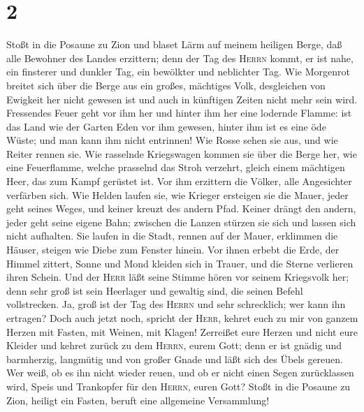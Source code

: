 \hypertarget{section-1}{%
\section{2}\label{section-1}}

 Stoßt in die Posaune zu Zion und blaset Lärm auf meinem
heiligen Berge, daß alle Bewohner des Landes erzittern; denn der Tag des
\textsc{Herrn} kommt, er ist nahe,  ein finsterer und
dunkler Tag, ein bewölkter und neblichter Tag. Wie Morgenrot breitet
sich über die Berge aus ein großes, mächtiges Volk, desgleichen von
Ewigkeit her nicht gewesen ist und auch in künftigen Zeiten nicht mehr
sein wird.  Fressendes Feuer geht vor ihm her und hinter
ihm her eine lodernde Flamme: ist das Land wie der Garten Eden vor ihm
gewesen, hinter ihm ist es eine öde Wüste; und man kann ihm nicht
entrinnen!  Wie Rosse sehen sie aus, und wie Reiter rennen
sie.  Wie rasselnde Kriegswagen kommen sie über die Berge
her, wie eine Feuerflamme, welche prasselnd das Stroh verzehrt, gleich
einem mächtigen Heer, das zum Kampf gerüstet ist.  Vor ihm
erzittern die Völker, alle Angesichter verfärben sich. 
Wie Helden laufen sie, wie Krieger ersteigen sie die Mauer, jeder geht
seines Weges, und keiner kreuzt des andern Pfad.  Keiner
drängt den andern, jeder geht seine eigene Bahn; zwischen die Lanzen
stürzen sie sich und lassen sich nicht aufhalten.  Sie
laufen in die Stadt, rennen auf der Mauer, erklimmen die Häuser, steigen
wie Diebe zum Fenster hinein.  Vor ihnen erbebt die Erde,
der Himmel zittert, Sonne und Mond kleiden sich in Trauer, und die
Sterne verlieren ihren Schein.  Und der \textsc{Herr}
läßt seine Stimme hören vor seinem Kriegsvolk her; denn sehr groß ist
sein Heerlager und gewaltig sind, die seinen Befehl vollstrecken. Ja,
groß ist der Tag des \textsc{Herrn} und sehr schrecklich; wer kann ihn
ertragen?  Doch auch jetzt noch, spricht der
\textsc{Herr}, kehret euch zu mir von ganzem Herzen mit Fasten, mit
Weinen, mit Klagen!  Zerreißet eure Herzen und nicht eure
Kleider und kehret zurück zu dem \textsc{Herrn}, eurem Gott; denn er ist
gnädig und barmherzig, langmütig und von großer Gnade und läßt sich des
Übels gereuen.  Wer weiß, ob es ihn nicht wieder reuen,
und ob er nicht einen Segen zurücklassen wird, Speis und Trankopfer für
den \textsc{Herrn}, euren Gott?  Stoßt in die Posaune zu
Zion, heiligt ein Fasten, beruft eine allgemeine Versammlung!
